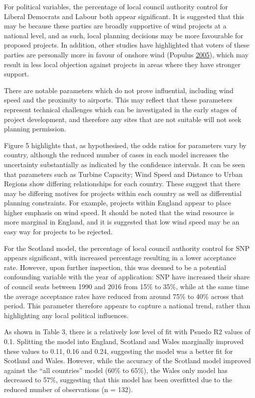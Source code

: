 \documentclass[a4paper,]{article}
\theoremstyle{definition}
\theoremstyle{definition}
\theoremstyle{remark}
\begin{document}
{For political variables, the percentage of local council authority
control for Liberal Democrats and Labour both appear significant. It is
suggested that this may be because these parties are broadly supportive
of wind projects at a national level, and as such, local planning
decisions may be more favourable for proposed projects. In addition,
other studies have highlighted that voters of these parties are
personally more in favour of onshore wind (Populus
\protect\hyperlink{ref-Populus2005}{2005}), which may result in less
local objection against projects in areas where they have stronger
support.

There are notable parameters which do not prove influential, including
wind speed and the proximity to airports. This may reflect that these
parameters represent technical challenges which can be investigated in
the early stages of project development, and therefore any sites that
are not suitable will not seek planning permission.

Figure 5 highlights that, as hypothesised, the odds ratios for
parameters vary by country, although the reduced number of cases in each
model increases the uncertainty substantially as indicated by the
confidence intervals. It can be seen that parameters such as Turbine
Capacity; Wind Speed and Distance to Urban Regions show differing
relationships for each country. These suggest that there may be
differing motives for projects within each country as well as
differential planning constraints. For example, projects within England
appear to place higher emphasis on wind speed. It should be noted that
the wind resource is more marginal in England, and it is suggested that
low wind speed may be an easy way for projects to be rejected.

For the Scotland model, the percentage of local council authority
control for SNP appears significant, with increased percentage resulting
in a lower acceptance rate. However, upon further inspection, this was
deemed to be a potential confounding variable with the year of
application: SNP have increased their share of council seats between
1990 and 2016 from 15\% to 35\%, while at the same time the average
acceptance rates have reduced from around 75\% to 40\% across that
period. This parameter therefore appears to capture a national trend,
rather than highlighting any local political influences.

As shown in Table 3, there is a relatively low level of fit with Psuedo
R2 values of 0.1. Splitting the model into England, Scotland and Wales
marginally improved these values to 0.11, 0.16 and 0.24, suggesting the
model was a better fit for Scotland and Wales. However, while the
accuracy of the Scotland model improved against the ``all countries''
model (60\% to 65\%), the Wales only model has decreased to 57\%,
suggesting that this model has been overfitted due to the reduced number
of observations (n = 132).

}
\end{document}
